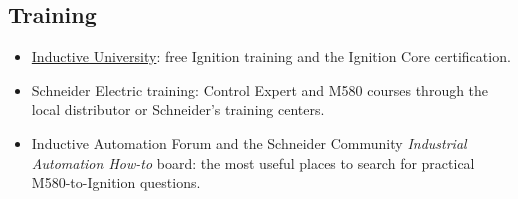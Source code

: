 \subsection*{Training}
\begin{itemize}[itemsep=1pt]
  \item \href{https://inductiveuniversity.com/}{Inductive University}: free Ignition training and the Ignition Core certification.
  \item Schneider Electric training: Control Expert and M580 courses through the local distributor or Schneider's training centers.
  \item Inductive Automation Forum and the Schneider Community \emph{Industrial Automation How-to} board: the most useful places to search for practical M580-to-Ignition questions.
\end{itemize}
